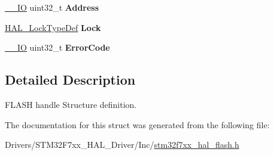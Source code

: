 \begin{DoxyCompactItemize}
\mbox{\hyperlink{core__sc300_8h_aec43007d9998a0a0e01faede4133d6be}{\+\_\+\+\_\+\+IO}} uint32\+\_\+t {\bfseries Address}
\item 
\mbox{\label{struct_f_l_a_s_h___process_type_def_ab5892cd1aacb0c0304b40f57023061e2}} 
\mbox{\hyperlink{stm32f7xx__hal__def_8h_ab367482e943333a1299294eadaad284b}{H\+A\+L\+\_\+\+Lock\+Type\+Def}} {\bfseries Lock}
\item 
\mbox{\label{struct_f_l_a_s_h___process_type_def_a8a6cc581b8b180090429d0a3c0ca0172}} 
\mbox{\hyperlink{core__sc300_8h_aec43007d9998a0a0e01faede4133d6be}{\+\_\+\+\_\+\+IO}} uint32\+\_\+t {\bfseries Error\+Code}
\end{DoxyCompactItemize}


\subsection{Detailed Description}
F\+L\+A\+SH handle Structure definition. 

The documentation for this struct was generated from the following file\+:\begin{DoxyCompactItemize}
\item 
Drivers/\+S\+T\+M32\+F7xx\+\_\+\+H\+A\+L\+\_\+\+Driver/\+Inc/\mbox{\hyperlink{stm32f7xx__hal__flash_8h}{stm32f7xx\+\_\+hal\+\_\+flash.\+h}}\end{DoxyCompactItemize}

